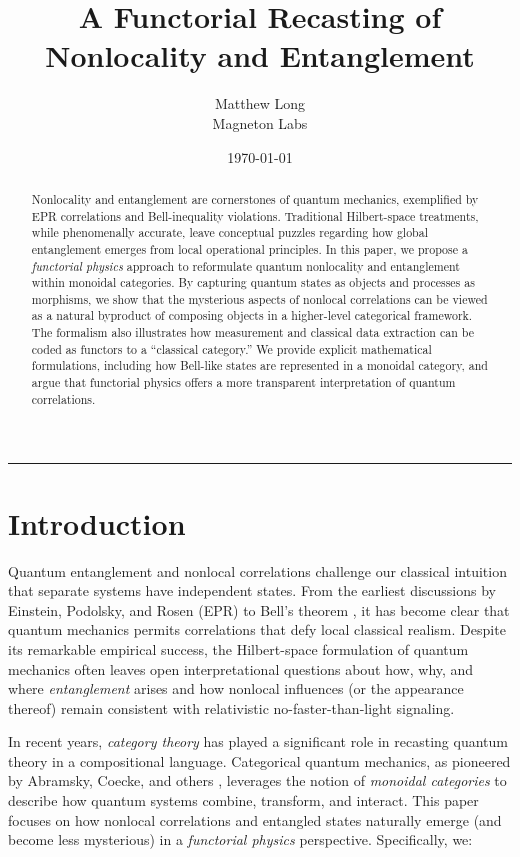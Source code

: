 \documentclass[12pt]{article}
\title{\bf A Functorial Recasting of Nonlocality and Entanglement}
\author{Matthew Long \\
Magneton Labs}
\date{\today}
\begin{document}
\maketitle

\begin{abstract}
Nonlocality and entanglement are cornerstones of quantum mechanics, exemplified by EPR correlations and Bell-inequality violations. Traditional Hilbert-space treatments, while phenomenally accurate, leave conceptual puzzles regarding how global entanglement emerges from local operational principles. In this paper, we propose a \emph{functorial physics} approach to reformulate quantum nonlocality and entanglement within monoidal categories. By capturing quantum states as objects and processes as morphisms, we show that the mysterious aspects of nonlocal correlations can be viewed as a natural byproduct of composing objects in a higher-level categorical framework. The formalism also illustrates how measurement and classical data extraction can be coded as functors to a ``classical category.'' We provide explicit mathematical formulations, including how Bell-like states are represented in a monoidal category, and argue that functorial physics offers a more transparent interpretation of quantum correlations.
\end{abstract}

\hrule
\vspace{1em}

\section{Introduction}
Quantum entanglement and nonlocal correlations challenge our classical intuition that separate systems have independent states. From the earliest discussions by Einstein, Podolsky, and Rosen (EPR) \cite{EPR1935} to Bell’s theorem \cite{Bell1964}, it has become clear that quantum mechanics permits correlations that defy local classical realism. Despite its remarkable empirical success, the Hilbert-space formulation of quantum mechanics often leaves open interpretational questions about how, why, and where \emph{entanglement} arises and how nonlocal influences (or the appearance thereof) remain consistent with relativistic no-faster-than-light signaling.

In recent years, \emph{category theory} has played a significant role in recasting quantum theory in a compositional language. Categorical quantum mechanics, as pioneered by Abramsky, Coecke, and others \cite{AbramskyCoecke, HeunenVicary}, leverages the notion of \emph{monoidal categories} to describe how quantum systems combine, transform, and interact. This paper focuses on how nonlocal correlations and entangled states naturally emerge (and become less mysterious) in a \emph{functorial physics} perspective. Specifically, we:
\end{document}
